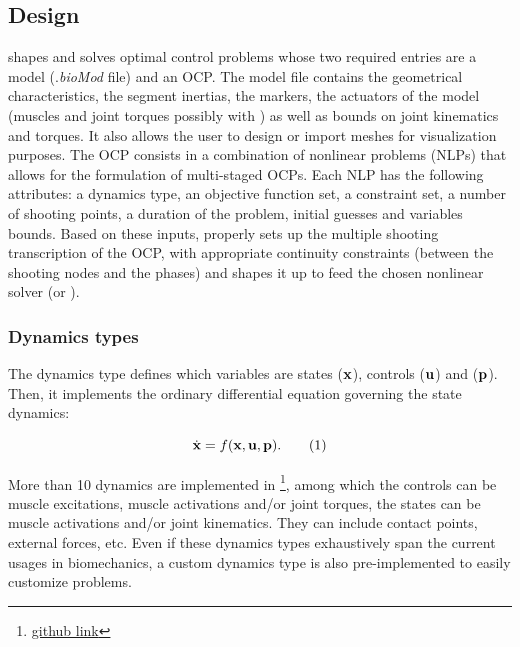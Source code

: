 \subsection{Design}
\bioptim shapes and solves optimal control problems whose two required entries are a model (.\textit{bioMod} file) and an OCP.
The model file contains the geometrical characteristics, the segment inertias, the markers, the actuators of the model (muscles and joint torques possibly with ) as well as bounds on joint kinematics and torques. 
It also allows the user to design or import meshes for visualization purposes.
The OCP consists in a combination of nonlinear problems (NLPs) that allows for the formulation of multi-staged OCPs. 
Each NLP has the following attributes: a dynamics type, an objective function set, a constraint set, a number of shooting points, a duration of the problem, initial guesses and variables bounds.
Based on these inputs, \bioptim properly sets up the multiple shooting transcription of the OCP, with appropriate continuity constraints (between the shooting nodes and the phases) and shapes it up to feed the chosen nonlinear solver (\ipopt or \acados). 

\subsubsection{Dynamics types}
The dynamics type defines which variables are states ($\mathbf{x}$), controls ($\mathbf{u}$) and  ($\mathbf{p}$).
Then, it implements the ordinary differential equation governing the state dynamics:

\[
\dstate = f(\state, \control, \param).
\addtag
\label{eq:state_transition}
\]

\noindent More than 10 dynamics are implemented in \bioptim \footnote{\href{https://github.com/pyomeca/bioptim/blob/master/bioptim/dynamics/dynamics_functions.py}{github link}}, among which the controls can be muscle excitations, muscle activations and/or joint torques, the states can be muscle activations and/or joint kinematics.
They can include contact points, external forces, etc.
Even if these dynamics types exhaustively span the current usages in biomechanics, a custom dynamics type is also pre-implemented to easily customize problems.

